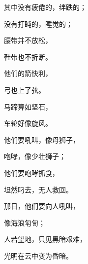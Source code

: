{\par }{\Q {}其中没有疲倦的，绊跌的；
\par }{\Q 没有打盹的，睡觉的；
\par }{\Q 腰带并不放松，
\par }{\Q 鞋带也不折断。
\par }{\Q {}他们的箭快利，
\par }{\Q 弓也上了弦。
\par }{\Q 马蹄算如坚石，
\par }{\Q 车轮好像旋风。
\par }{\Q {}他们要吼叫，像母狮子，
\par }{\Q 咆哮，像少壮狮子；
\par }{\Q 他们要咆哮抓食，
\par }{\Q 坦然叼去，无人救回。
\par }{\Q {}那日，他们要向{}人吼叫，
\par }{\Q 像海浪匉訇；
\par }{\Q 人若望地，只见黑暗艰难，
\par }{\Q 光明在云中变为昏暗。

}
